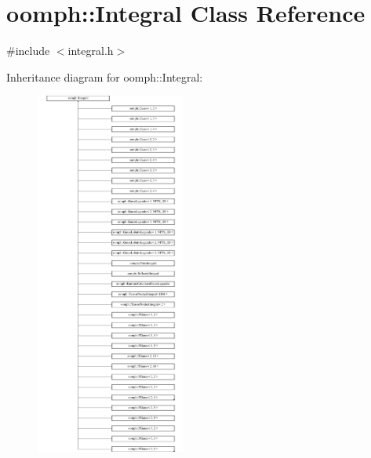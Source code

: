 \hypertarget{classoomph_1_1Integral}{}\section{oomph\+:\+:Integral Class Reference}
\label{classoomph_1_1Integral}


{\ttfamily \#include $<$integral.\+h$>$}

Inheritance diagram for oomph\+:\+:Integral\+:\begin{figure}[H]
\begin{center}
\leavevmode
\includegraphics[height=12.000000cm]{classoomph_1_1Integral}
\end{center}
\end{figure}
